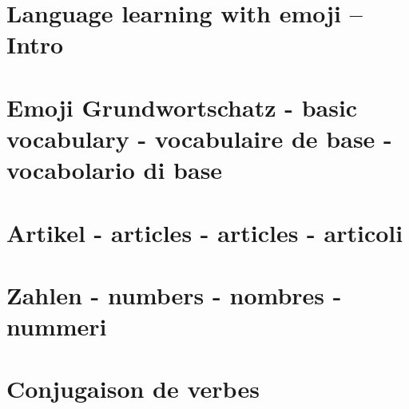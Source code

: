 \documentclass[fontsize=12pt, twoside=false, secnumdepth=1]{article}
\begin{document}
\section*{Language learning with emoji -- Intro}

\tableofcontents



\section{Emoji Grundwortschatz - basic vocabulary - vocabulaire de base - vocabolario di base}


\section{Artikel - articles - articles - articoli}


\section{Zahlen - numbers - nombres - nummeri}


\section{Conjugaison de verbes}

\end{document}
